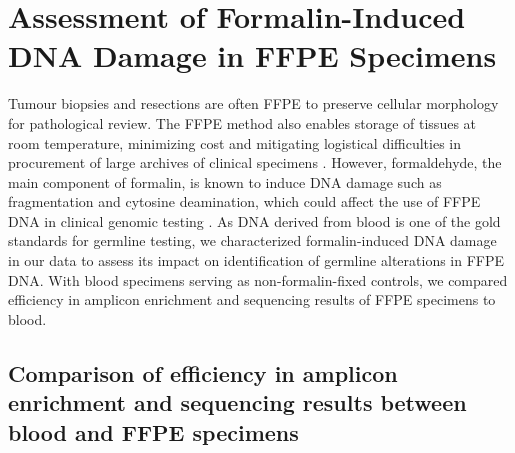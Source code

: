 
\chapter{Assessment of Formalin-Induced DNA Damage in FFPE Specimens}
\label{ch:AssessmentofFormalin-InducedDNADamageinFFPESpecimens}

Tumour biopsies and resections are often FFPE to preserve cellular morphology for pathological review. The FFPE method also enables storage of tissues at room temperature, minimizing cost and mitigating logistical difficulties in procurement of large archives of clinical specimens \cite{Lou2014}. However, formaldehyde, the main component of formalin, is known to induce DNA damage such as fragmentation and cytosine deamination, which could affect the use of FFPE DNA in clinical genomic testing \cite{Do2015a, Kim2017, Ofner2017, Oh2015, Wong2013, Wong2014, Sikorsky2007}. As DNA derived from blood is one of the gold standards for germline testing, we characterized formalin-induced DNA damage in our data to assess its impact on identification of germline alterations in FFPE DNA. With blood specimens serving as non-formalin-fixed controls, we compared efficiency in amplicon enrichment and sequencing results of FFPE specimens to blood.

\section{Comparison of efficiency in amplicon enrichment and sequencing results between blood and FFPE specimens}
\label{sec:ComparisonofefficiencyinampliconenrichmentandsequencingresultsbetweenbloodandFFPEspecimens}


